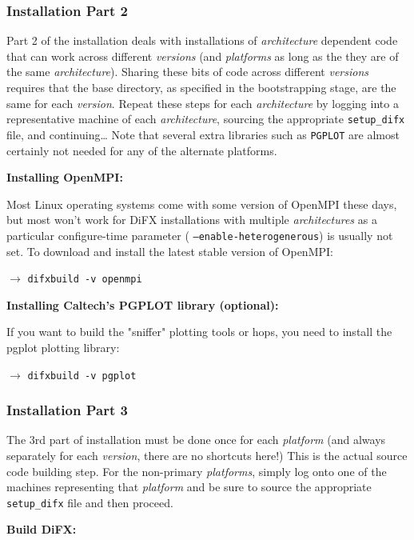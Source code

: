 \subsubsection{Installation Part 2}

Part 2 of the installation deals with installations of {\em architecture} dependent code that can work across different {\em versions} (and {\em platforms} as long as the they are of the same {\em architecture}).
Sharing these bits of code across different {\em versions} requires that the base directory, as specified in the bootstrapping stage, are the same for each {\em version}.
Repeat these steps for each {\em architecture} by logging into a representative machine of each {\em architecture}, sourcing the appropriate {\tt setup\_difx} file, and continuing\ldots
Note that several extra libraries such as {\tt PGPLOT} are almost certainly not needed for any of the alternate platforms.

\vspace{10pt}
\noindent
{\bf Installing OpenMPI:}

Most Linux operating systems come with some version of OpenMPI these days, but most won't work for DiFX installations with multiple {\em architectures} as a particular configure-time parameter ( {\tt --enable-heterogenerous}) is usually not set.
To download and install the latest stable version of OpenMPI:

$\longrightarrow$ {\tt difxbuild -v openmpi}

\vspace{10pt}
\noindent
{\bf Installing Caltech's PGPLOT library (optional):}

If you want to build the "sniffer" plotting tools or hops, you need to install the pgplot plotting library:

$\longrightarrow$ {\tt difxbuild -v pgplot}

\subsubsection{Installation Part 3}

The 3rd part of installation must be done once for each {\em platform} (and always separately for each {\em version}, there are no shortcuts here!)
This is the actual source code building step.
For the non-primary {\em platforms}, simply log onto one of the machines representing that {\em platform} and be sure to source the appropriate {\tt setup\_difx} file and then proceed.

\vspace{10pt}
\noindent
{\bf Build DiFX:}

